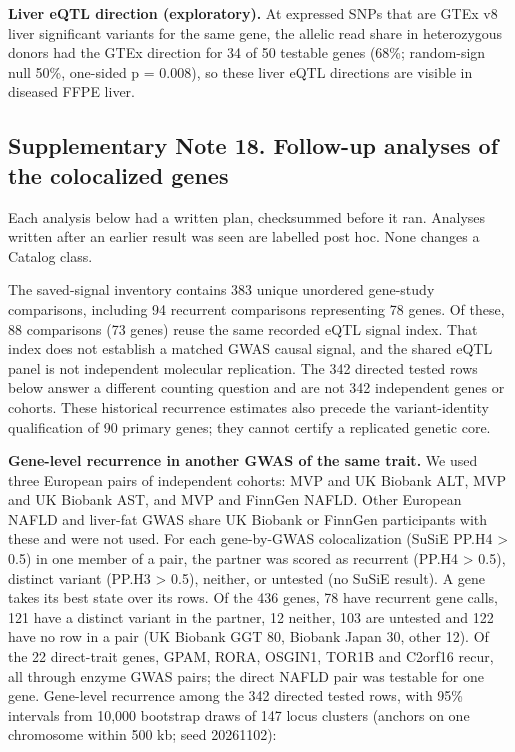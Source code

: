 \textbf{Liver eQTL direction (exploratory).} At expressed SNPs that are GTEx v8 liver significant variants for the same gene, the allelic read share in heterozygous donors had the GTEx direction for 34 of 50 testable genes (68\%; random-sign null 50\%, one-sided p = 0.008), so these liver eQTL directions are visible in diseased FFPE liver.

\subsection{Supplementary Note 18. Follow-up analyses of the colocalized genes}\label{supplementary-note-18.-follow-up-analyses-of-the-colocalized-genes}

Each analysis below had a written plan, checksummed before it ran. Analyses written after an earlier result was seen are labelled post hoc. None changes a Catalog class.

The saved-signal inventory contains 383 unique unordered gene-study comparisons,
including 94 recurrent comparisons representing 78 genes. Of these, 88
comparisons (73 genes) reuse the same recorded eQTL signal index. That index
does not establish a matched GWAS causal signal, and the shared eQTL panel is
not independent molecular replication. The 342 directed tested rows below
answer a different counting question and are not 342 independent genes or
cohorts. These historical recurrence estimates also precede the variant-identity
qualification of 90 primary genes; they cannot certify a replicated genetic core.

\textbf{Gene-level recurrence in another GWAS of the same trait.} We used three European pairs of independent cohorts: MVP and UK Biobank ALT, MVP and UK Biobank AST, and MVP and FinnGen NAFLD. Other European NAFLD and liver-fat GWAS share UK Biobank or FinnGen participants with these and were not used. For each gene-by-GWAS colocalization (SuSiE PP.H4 \textgreater{} 0.5) in one member of a pair, the partner was scored as recurrent (PP.H4 \textgreater{} 0.5), distinct variant (PP.H3 \textgreater{} 0.5), neither, or untested (no SuSiE result). A gene takes its best state over its rows. Of the 436 genes, 78 have recurrent gene calls, 121 have a distinct variant in the partner, 12 neither, 103 are untested and 122 have no row in a pair (UK Biobank GGT 80, Biobank Japan 30, other 12). Of the 22 direct-trait genes, GPAM, RORA, OSGIN1, TOR1B and C2orf16 recur, all through enzyme GWAS pairs; the direct NAFLD pair was testable for one gene. Gene-level recurrence among the 342 directed tested rows, with 95\% intervals from 10,000 bootstrap draws of 147 locus clusters (anchors on one chromosome within 500 kb; seed 20261102):

